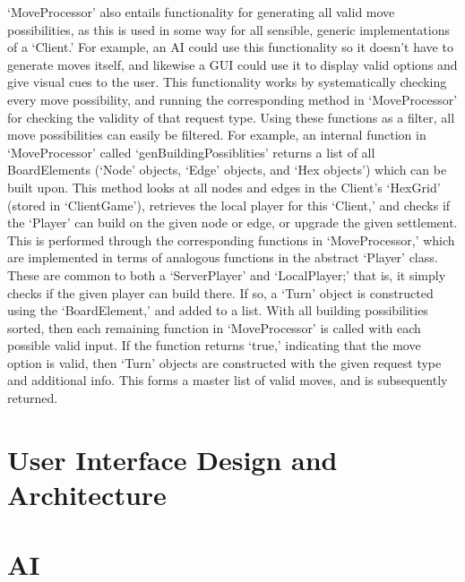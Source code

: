 \documentclass[a4paper,doc,draftfirst]{apa6}
\begin{document}
‘MoveProcessor’ also entails functionality for generating all valid move possibilities, as this is used in some way for all sensible, generic implementations of a ‘Client.’ For example, an AI could use this functionality so it doesn’t have to generate moves itself, and likewise a GUI could use it to display valid options and give visual cues to the user. This functionality works by systematically checking every move possibility, and running the corresponding method in ‘MoveProcessor’ for checking the  validity of that request type. Using these functions as a filter, all move possibilities can easily be filtered. For example, an internal function in ‘MoveProcessor’ called ‘genBuildingPossiblities’ returns a list of all BoardElements (‘Node’ objects, ‘Edge’ objects, and ‘Hex objects’) which can be built upon. This method looks at all nodes and edges in the Client’s ‘HexGrid’ (stored in ‘ClientGame’), retrieves the local player for this ‘Client,’ and checks if the ‘Player’ can build on the given node or edge, or upgrade the given settlement. This is performed through the corresponding functions in ‘MoveProcessor,’ which are implemented in terms of analogous functions in the abstract ‘Player’ class. These are common to both a ‘ServerPlayer’ and ‘LocalPlayer;’ that is, it simply checks if the given player can build there. If so, a ‘Turn’ object is constructed using the ‘BoardElement,’ and added to a list. With all building possibilities sorted, then each remaining function in ‘MoveProcessor’ is called with each possible valid input. If the function returns ‘true,’ indicating that the move option is valid, then ‘Turn’ objects are constructed with the given request type and additional info. This forms a master list of valid moves, and is subsequently returned.

\section{User Interface Design and Architecture}

\section{AI}
\end{document}
